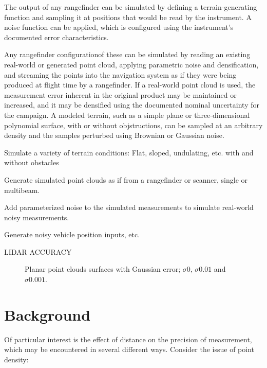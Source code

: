 \documentclass[10pt,a4paper]{report}
\begin{document}
The output of any rangefinder can be simulated by defining a terrain-generating function and sampling it at positions that would be read by the instrument. A noise function can be applied, which is configured using the instrument's documented error characteristics. 



Any rangefinder configurationof these can be simulated by reading an existing real-world or generated point cloud, applying parametric noise and densification, and streaming the points into the navigation system as if they were being produced at flight time by a rangefinder. If a real-world point cloud is used, the measurement error inherent in the original product may be maintained or increased, and it may be densified using the documented nominal uncertainty for the campaign. A modeled terrain, such as a simple plane or three-dimensional polynomial surface, with or without objstructions, can be sampled at an arbitrary density and the samples perturbed using Brownian or Gaussian noise.

Simulate a variety of terrain conditions: Flat, sloped, undulating, etc. with and without obstacles

Generate simulated point clouds as if from a rangefinder or scanner, single or multibeam.

Add parameterized noise to the simulated measurements to simulate real-world noisy measurements.

Generate noisy vehicle position inputs, etc.

LIDAR ACCURACY \cite{May2007}

\begin{figure}
\centering
\def\svgscale{0.4}

\def\svgscale{0.4}

\def\svgscale{0.4}

\caption{Planar point clouds surfaces with Gaussian error; $\sigma 0$, $\sigma 0.01$ and $\sigma 0.001$.}
\label{fig:plane_smooth}
\end{figure}


\section{Background}

Of particular interest is the effect of distance on the precision of measurement, which may be encountered in several different ways. Consider the issue of point density:
\end{document}
